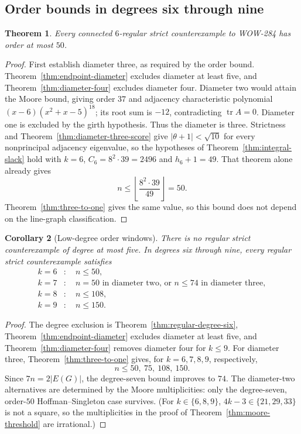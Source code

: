 \documentclass[a4paper,10pt,reqno]{amsart}
\theoremstyle{plain}
\newtheorem{theorem}{Theorem}[section]
\newtheorem{corollary}[theorem]{Corollary}
\theoremstyle{definition}
\theoremstyle{remark}
\newcommand{\tr}{\operatorname{tr}}
\begin{document}
\subsection{Order bounds in degrees six through nine}

\begin{theorem}\label{thm:degree-six-fifty}
Every connected \(6\)-regular strict counterexample to WOW-284 has order at
most \(50\).
\end{theorem}

\begin{proof}
First establish diameter three, as required by the order bound.
Theorem~\ref{thm:endpoint-diameter} excludes diameter at least five, and
Theorem~\ref{thm:diameter-four} excludes diameter four. Diameter two would
attain the Moore bound, giving order \(37\) and adjacency characteristic polynomial
\((x-6)(x^2+x-5)^{18}\); its root sum is \(-12\), contradicting
\(\tr A=0\).  Diameter one is excluded by the girth hypothesis.  Thus the
diameter is three. Strictness and Theorem~\ref{thm:diameter-three-score}
give \(|\theta+1|<\sqrt{10}\) for every nonprincipal adjacency eigenvalue,
so the hypotheses of Theorem~\ref{thm:integral-slack} hold with \(k=6\),
\(C_6=8^2\cdot39=2496\) and \(h_6+1=49\). That theorem alone already gives
\[
 n\le\left\lfloor\frac{8^2\cdot39}{49}\right\rfloor=50.
\]
Theorem~\ref{thm:three-to-one} gives the same value, so this bound does not
depend on the line-graph classification.
\end{proof}

\begin{corollary}[Low-degree order windows]\label{cor:low-degree-windows}
There is no regular strict counterexample of degree at most five.  In degrees
six through nine, every regular strict counterexample satisfies
\begin{align*}
k=6&:\quad n\le50,\\
k=7&:\quad n=50\text{ in diameter two, or }n\le74\text{ in diameter three},\\
k=8&:\quad n\le108,\\
k=9&:\quad n\le150.
\end{align*}
\end{corollary}

\begin{proof}
The degree exclusion is Theorem~\ref{thm:regular-degree-six},
Theorem~\ref{thm:endpoint-diameter} excludes diameter at least five, and
Theorem~\ref{thm:diameter-four} removes diameter four for \(k\le9\).
 For diameter three, Theorem~\ref{thm:three-to-one} gives, for
\(k=6,7,8,9\), respectively,
\[
 n\le50,\ 75,\ 108,\ 150.
\]
Since \(7n=2|E(G)|\), the degree-seven bound improves to \(74\).  The
diameter-two alternatives are determined by the Moore multiplicities: only
the degree-seven, order-\(50\) Hoffman--Singleton case survives.
(For \(k\in\{6,8,9\}\), \(4k-3\in\{21,29,33\}\) is not a square, so the
multiplicities in the proof of Theorem~\ref{thm:moore-threshold} are
irrational.)
\end{proof}
\end{document}
